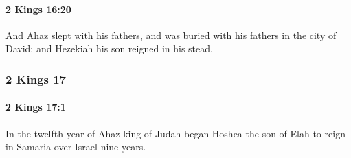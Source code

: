 		\paragraph{2 Kings 16:20} %
			\label{2KINGS-16-20}

			And Ahaz slept with his fathers, and was buried with his fathers in the city of David: and Hezekiah his son reigned in his stead.

	\subsubsection{2 Kings 17} %
		\label{2KINGS-17}

		\paragraph{2 Kings 17:1} %
			\label{2KINGS-17-1}

			In the twelfth year of Ahaz king of Judah began Hoshea the son of Elah to reign in Samaria over Israel nine years.

